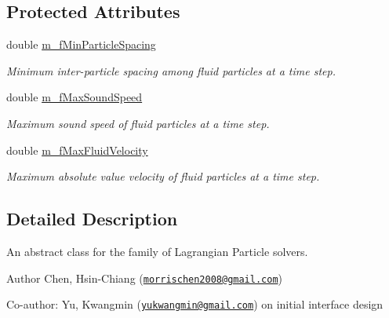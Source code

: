 \subsection*{Protected Attributes}
\begin{DoxyCompactItemize}
\item 
\hypertarget{classLPSolver_a340b02b362cffd269af3e11a5b5880db}{double \hyperlink{classLPSolver_a340b02b362cffd269af3e11a5b5880db}{m\-\_\-f\-Min\-Particle\-Spacing}}\label{classLPSolver_a340b02b362cffd269af3e11a5b5880db}

\begin{DoxyCompactList}\small\item\em Minimum inter-\/particle spacing among fluid particles at a time step. \end{DoxyCompactList}\item 
\hypertarget{classLPSolver_a788fe64d779808fd4d57c41336bf604d}{double \hyperlink{classLPSolver_a788fe64d779808fd4d57c41336bf604d}{m\-\_\-f\-Max\-Sound\-Speed}}\label{classLPSolver_a788fe64d779808fd4d57c41336bf604d}

\begin{DoxyCompactList}\small\item\em Maximum sound speed of fluid particles at a time step. \end{DoxyCompactList}\item 
\hypertarget{classLPSolver_ac1107221647c560b5133225491b682bd}{double \hyperlink{classLPSolver_ac1107221647c560b5133225491b682bd}{m\-\_\-f\-Max\-Fluid\-Velocity}}\label{classLPSolver_ac1107221647c560b5133225491b682bd}

\begin{DoxyCompactList}\small\item\em Maximum absolute value velocity of fluid particles at a time step. \end{DoxyCompactList}\end{DoxyCompactItemize}


\subsection{Detailed Description}
An abstract class for the family of Lagrangian Particle solvers. 

\begin{DoxyAuthor}{Author}
Chen, Hsin-\/\-Chiang (\href{mailto:morrischen2008@gmail.com}{\tt morrischen2008@gmail.\-com})
\end{DoxyAuthor}
Co-\/author\-: Yu, Kwangmin (\href{mailto:yukwangmin@gmail.com}{\tt yukwangmin@gmail.\-com}) on initial interface design

